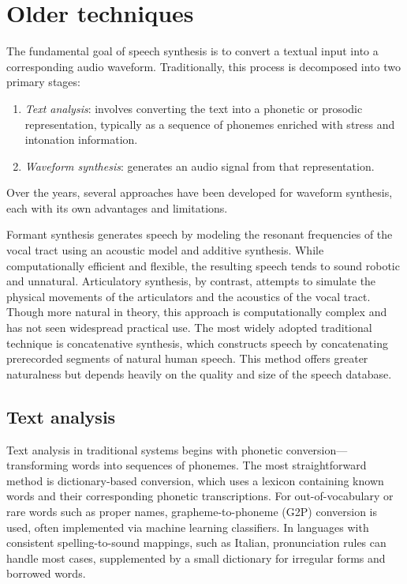 \section{Older techniques}

The fundamental goal of speech synthesis is to convert a textual input into a corresponding audio waveform. 
Traditionally, this process is decomposed into two primary stages: 
\begin{enumerate}
    \item \textit{Text analysis}: involves converting the text into a phonetic or prosodic representation, typically as a sequence of phonemes enriched with stress and intonation information.
    \item \textit{Waveform synthesis}: generates an audio signal from that representation. 
\end{enumerate}
\noindent Over the years, several approaches have been developed for waveform synthesis, each with its own advantages and limitations.

Formant synthesis generates speech by modeling the resonant frequencies of the vocal tract using an acoustic model and additive synthesis. 
While computationally efficient and flexible, the resulting speech tends to sound robotic and unnatural. 
Articulatory synthesis, by contrast, attempts to simulate the physical movements of the articulators and the acoustics of the vocal tract. 
Though more natural in theory, this approach is computationally complex and has not seen widespread practical use. 
The most widely adopted traditional technique is concatenative synthesis, which constructs speech by concatenating prerecorded segments of natural human speech. 
This method offers greater naturalness but depends heavily on the quality and size of the speech database.

\subsection{Text analysis}
Text analysis in traditional systems begins with phonetic conversion—transforming words into sequences of phonemes. 
The most straightforward method is dictionary-based conversion, which uses a lexicon containing known words and their corresponding phonetic transcriptions. 
For out-of-vocabulary or rare words such as proper names, grapheme-to-phoneme (G2P) conversion is used, often implemented via machine learning classifiers. 
In languages with consistent spelling-to-sound mappings, such as Italian, pronunciation rules can handle most cases, supplemented by a small dictionary for irregular forms and borrowed words.

